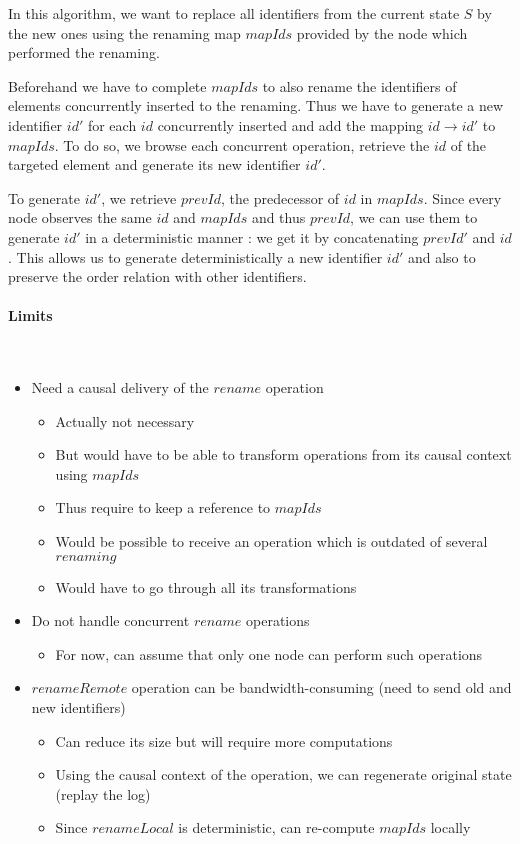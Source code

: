 \documentclass[a4paper]{article}
\begin{document}
In this algorithm, we want to replace all identifiers from the current state $S$
by the new ones using the renaming map $mapIds$ provided by the node which
performed the renaming.

Beforehand we have to complete $mapIds$ to also rename the identifiers of elements
concurrently inserted to the renaming. Thus we have to generate a new identifier
$id'$ for each $id$ concurrently inserted and add the mapping $id \to id'$ to $mapIds$.
To do so, we browse each concurrent operation, retrieve the $id$ of the targeted
element and generate its new identifier $id'$.

To generate $id'$, we retrieve $prevId$, the predecessor of $id$ in $mapIds$.
Since every node observes the same $id$ and $mapIds$ and thus $prevId$, we can use them to
generate $id'$ in a deterministic manner : we get it by concatenating $prevId'$ and $id$.
This allows us to generate deterministically a new identifier $id'$
and also to preserve the order relation with other identifiers.

\paragraph{Limits}~\\

\begin{itemize}
  \item Need a causal delivery of the $rename$ operation
  \begin{itemize}
    \item Actually not necessary
    \item But would have to be able to transform operations from its causal context using $mapIds$
    \item Thus require to keep a reference to $mapIds$
    \item Would be possible to receive an operation which is outdated of several $renaming$
    \item Would have to go through all its transformations
  \end{itemize}
  \item Do not handle concurrent $rename$ operations
  \begin{itemize}
    \item For now, can assume that only one node can perform such operations
  \end{itemize}
  \item $renameRemote$ operation can be bandwidth-consuming (need to send old and new identifiers)
  \begin{itemize}
    \item Can reduce its size but will require more computations
    \item Using the causal context of the operation, we can regenerate original state (replay the log)
    \item Since $renameLocal$ is deterministic, can re-compute $mapIds$ locally
  \end{itemize}
\end{itemize}
\end{document}
